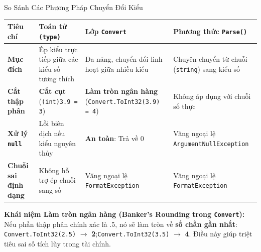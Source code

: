 \documentclass[aspectratio=169, 10pt]{beamer}
\begin{document}
\begin{frame}[fragile]{So Sánh Các Phương Pháp Chuyển Đổi Kiểu}
  \begin{table}[h]
    \centering
    \small
    \begin{tabularx}{\textwidth}{l p{3.6cm} p{3.4cm} p{3.4cm}}
      \toprule
      \textbf{Tiêu chí} & \textbf{Toán tử \texttt{(type)}} & \textbf{Lớp \texttt{Convert}} & \textbf{Phương thức \texttt{Parse()}} \\
      \midrule
      \textbf{Mục đích} & Ép kiểu trực tiếp giữa các kiểu số tương thích & Đa năng, chuyển đổi linh hoạt giữa nhiều kiểu & Chuyên chuyển từ chuỗi (\texttt{string}) sang kiểu số \\
      \addlinespace
      \textbf{Cắt thập phân} & \textbf{Cắt cụt} (\texttt{(int)3.9 = 3}) & \textbf{Làm tròn ngân hàng} (\texttt{Convert.ToInt32(3.9) = 4}) & Không áp dụng với chuỗi số thực \\
      \addlinespace
      \textbf{Xử lý \texttt{null}} & Lỗi biên dịch nếu kiểu nguyên thủy & \textbf{An toàn}: Trả về 0 & Văng ngoại lệ \texttt{ArgumentNullException} \\
      \addlinespace
      \textbf{Chuỗi sai định dạng} & Không hỗ trợ ép chuỗi sang số & Văng ngoại lệ \texttt{FormatException} & Văng ngoại lệ \texttt{FormatException} \\
      \bottomrule
    \end{tabularx}
  \end{table}

  \begin{exampleblock}{\textbf{Khái niệm Làm tròn ngân hàng (Banker's Rounding trong \texttt{Convert}):}}
    Nếu phần thập phân chính xác là $.5$, nó sẽ làm tròn về \textbf{số chẵn gần nhất}:
    \texttt{Convert.ToInt32(2.5)} $\to$ \textbf{2};\quad \texttt{Convert.ToInt32(3.5)} $\to$ \textbf{4}. Điều này giúp triệt tiêu sai số tích lũy trong tài chính.
  \end{exampleblock}
\end{frame}
\end{document}
